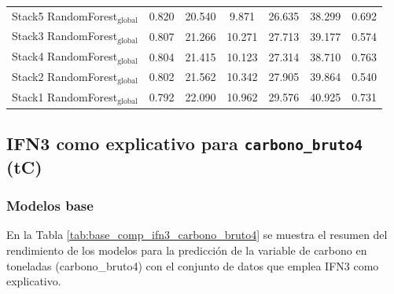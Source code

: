 \begin{table}[tp]
{\begin{tabular}{p{4.5cm}cccccc}
        Stack5 RandomForest$_{\text{global}}$ & 0.820 & 20.540 & 9.871 & 26.635 & 38.299 & 0.692 \\
        Stack3 RandomForest$_{\text{global}}$ & 0.807 & 21.266 & 10.271 & 27.713 & 39.177 & 0.574 \\
        Stack4 RandomForest$_{\text{global}}$ & 0.804 & 21.415 & 10.123 & 27.314 & 38.710 & 0.763 \\
        Stack2 RandomForest$_{\text{global}}$ & 0.802 & 21.562 & 10.342 & 27.905 & 39.864 & 0.540 \\
        Stack1 RandomForest$_{\text{global}}$ & 0.792 & 22.090 & 10.962 & 29.576 & 40.925 & 0.731 \\
            \bottomrule
    \end{tabular}
    }
\end{table}


\clearpage
\subsection{IFN3 como explicativo para \texttt{carbono\_bruto4} (tC)}

\subsubsection{Modelos base}

En la Tabla \ref{tab:base_comp_ifn3_carbono_bruto4} se muestra el resumen del rendimiento de los modelos para la predicción de la variable de carbono en toneladas (carbono\_bruto4) con el conjunto de datos que emplea IFN3 como explicativo.

